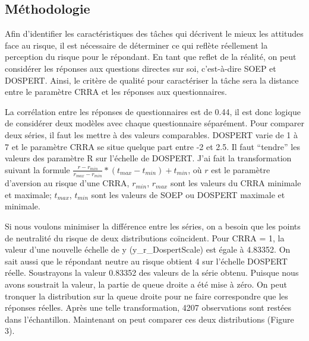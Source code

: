 \documentclass[12pt]{article}
\begin{document}
\subsection{Méthodologie}

Afin d'identifier les caractéristiques des tâches qui décrivent le mieux
les attitudes face au risque, il est nécessaire de déterminer ce qui
reflète réellement la perception du risque pour le répondant. En tant
que reflet de la réalité, on peut considérer les réponses aux questions
directes sur soi, c'est-à-dire SOEP et DOSPERT. Ainsi, le critère de
qualité pour caractériser la tâche sera la distance entre le paramètre
CRRA et les réponses aux questionnaires.

La corrélation entre les réponses de questionnaires est de 0.44, il est
donc logique de considérer deux modèles avec chaque questionnaire
séparément. Pour comparer deux séries, il faut les mettre à des valeurs
comparables. DOSPERT varie de 1 à 7 et le paramètre CRRA se situe
quelque part entre -2 et 2.5. Il faut ``tendre'' les valeurs des
paramètre R sur l'échelle de DOSPERT. J'ai fait la transformation
suivant la formule
\(\frac{r - r_{min}}{r_{max} - r_{min}} * (t_{max} - t_{min}) + t_{min}\),
où \(r\) est le paramètre d'aversion au risque d'une CRRA, \(r_{min}\),
\(r_{max}\) sont les valeurs du CRRA minimale et maximale; \(t_{max}\),
\(t_{min}\) sont les valeurs de SOEP ou DOSPERT maximale et minimale.

Si nous voulons minimiser la différence entre les séries, on a besoin
que les points de neutralité du risque de deux distributions coïncident.
Pour CRRA = 1, la valeur d'une nouvelle échelle de y
(y\_r\_DospertScale) est égale à 4.83352. On sait aussi que le répondant
neutre au risque obtient 4 sur l'échelle DOSPERT réelle. Soustrayons la
valeur 0.83352 des valeurs de la série obtenu. Puisque nous avons
soustrait la valeur, la partie de queue droite a été mise à zéro. On
peut tronquer la distribution sur la queue droite pour ne faire
correspondre que les réponses réelles. Après une telle transformation,
4207 observations sont restées dans l'échantillon. Maintenant on peut
comparer ces deux distributions (Figure 3).
\end{document}
